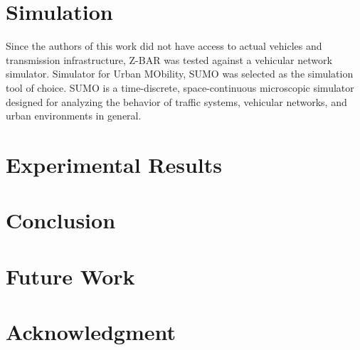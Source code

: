 \documentclass[conference]{IEEEtran}
\begin{document}
\section{Simulation}

Since the authors of this work did not have access to actual vehicles and transmission infrastructure, Z-BAR was tested against a vehicular network simulator. Simulator for Urban MObility, SUMO was selected as the simulation tool of choice. SUMO is a time-discrete, space-continuous microscopic simulator designed for analyzing the behavior of traffic systems, vehicular networks, and urban environments in general. 


\section{Experimental Results} %

\section{Conclusion} %

\section{Future Work} %

\section*{Acknowledgment}

\begin{thebibliography}{1}
\bibitem{}
\end{thebibliography}
\end{document}
